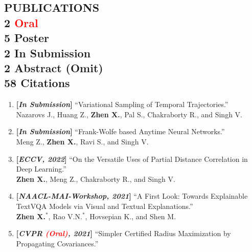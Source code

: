 \documentclass[margin]{res}
\begin{document}
\begin{resume}
\vspace{-1em}                
\section{PUBLICATIONS \\ \small{ 2 {\textcolor{red}{Oral}}\\ 5 Poster\\ 2 In Submission \\ 2 Abstract (Omit) \\ 58 Citations} }
                \begin{enumerate}[noitemsep,wide=0pt,leftmargin=\dimexpr\labelwidth + 2\labelsep\relax]\itemsep -0.0pt
                \item \textbf{[\emph{In Submission}]} ``Variational Sampling of Temporal Trajectories.''\\
                				Nazarovs J., Huang Z., \textbf{Zhen X.}, Pal S., Chakraborty R., 
                            and Singh V.
                \item \textbf{[\emph{In Submission}]} ``Frank-Wolfe based Anytime Neural Networks.''\\
                				Meng Z., \textbf{Zhen X.}, Ravi S., and Singh V.           
                \item \textbf{[\emph{ECCV, 2022}]} ``On the Versatile Uses of Partial Distance Correlation in Deep Learning.''\\
                            \textbf{Zhen X.}, Meng Z., Chakraborty R., and Singh V.
                \item \textbf{[\emph{NAACL-MAI-Workshop, 2021}]} ``A First Look: Towards Explainable TextVQA Models via Visual and Textual Explanations.''\\
                            \textbf{Zhen X.}$^*$, Rao V.N.$^*$, Hovsepian K., and Shen M.
                \item \textbf{[\emph{CVPR \textcolor{red}{(Oral)}, 2021}]} ``Simpler Certified Radius Maximization by Propagating Covariances.''\\

\end{enumerate}
\end{resume}
\end{document}
